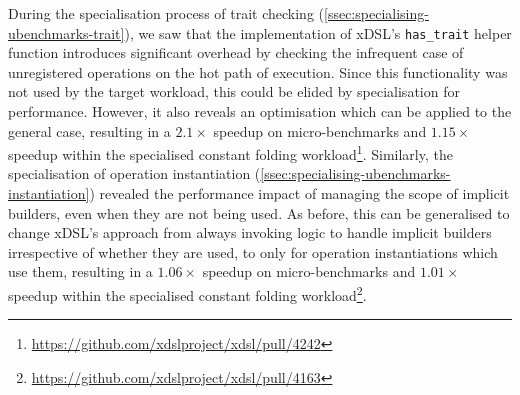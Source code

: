 During the specialisation process of trait checking (\autoref{ssec:specialising-ubenchmarks-trait}), we saw that the implementation of xDSL's \texttt{has\_trait} helper function introduces significant overhead by checking the infrequent case of unregistered operations on the hot path of execution.
Since this functionality was not used by the target workload, this could be elided by specialisation for performance. However, it also reveals an optimisation which can be applied to the general case, resulting in a $2.1\times$ speedup on micro-benchmarks and $1.15\times$ speedup within the specialised constant folding workload\footnote{\scriptsize{\url{https://github.com/xdslproject/xdsl/pull/4242}}}.
Similarly, the specialisation of operation instantiation (\autoref{ssec:specialising-ubenchmarks-instantiation}) revealed the performance impact of managing the scope of implicit builders, even when they are not being used. As before, this can be generalised to change xDSL's approach from always invoking logic to handle implicit builders irrespective of whether they are used, to only for operation instantiations which use them, resulting in a $1.06\times$ speedup on micro-benchmarks and $1.01\times$ speedup within the specialised constant folding workload\footnote{\scriptsize{\url{https://github.com/xdslproject/xdsl/pull/4163}}}.


